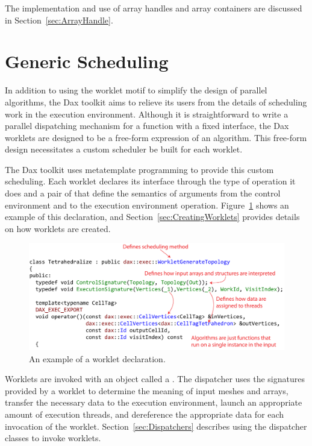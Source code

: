 The implementation and use of array handles and array containers are
discussed in Section~\ref{sec:ArrayHandle}.


\section{Generic Scheduling}
\label{sec:GenericScheduling}

In addition to using the worklet motif to simplify the design of parallel
algorithms, the Dax toolkit aims to relieve its users from the details of
scheduling work in the execution environment. Although it is
straightforward to write a parallel dispatching mechanism for a function
with a fixed interface, the Dax worklets are designed to be a free-form
expression of an algorithm. This free-form design necessitates a custom
scheduler be built for each worklet.

The Dax toolkit uses metatemplate programming to provide this custom
scheduling. Each worklet declares its interface through the type of
operation it does and a pair of  that
define the semantics of arguments from the control environment and to the
execution environment operation. Figure~\ref{fig:WorkletDeclaration} shows
an example of this declaration, and Section~\ref{sec:CreatingWorklets}
provides details on how worklets are created.

\begin{figure}[htb]
  \centering
  \includegraphics[width=\linewidth]{images/WorkletExampleAnnotated}
  \caption{An example of a worklet declaration.}
  \label{fig:WorkletDeclaration}
\end{figure}

Worklets are invoked with an object called a
. The dispatcher uses the signatures
provided by a worklet to determine the meaning of input meshes and arrays,
transfer the necessary data to the execution environment, launch an
appropriate amount of execution threads, and dereference the appropriate
data for each invocation of the worklet. Section~\ref{sec:Dispatchers}
describes using the dispatcher classes to invoke worklets.

